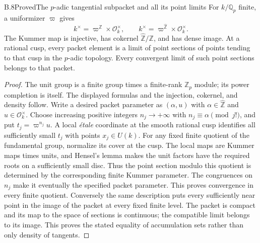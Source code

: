 \begin{statement}{B.8}{Proved}{The $p$-adic tangential subpacket and all its point limits}
For $k/\mathbb Q_p$ finite, a uniformizer $\varpi$ gives
\[
 k^\times=\varpi^{\mathbb Z}\times\mathcal O_k^\times,
 \qquad \widehat{k^\times}=\varpi^{\widehat{\mathbb Z}}
                         \times\mathcal O_k^\times.
\]
The Kummer map is injective, has cokernel
$\widehat{\mathbb Z}/\mathbb Z$, and has dense image.
At a rational cusp, every packet element is a limit of point sections
of points tending to that cusp in the $p$-adic topology.  Every
convergent limit of such point sections belongs to that packet.
\end{statement}
\begin{proof}
The unit group is a finite group times a finite-rank $\mathbb Z_p$
module; its power completion is itself.  The displayed formulas and
the injection, cokernel, and density follow.
Write a desired packet parameter as $(\alpha,u)$ with
$\alpha\in\widehat{\mathbb Z}$ and $u\in\mathcal O_k^\times$.
Choose increasing positive integers $n_j\to+\infty$ with
$n_j\equiv\alpha\pmod{j!}$, and put $t_j=\varpi^{n_j}u$.
A local \emph{\'etale} coordinate at the smooth rational cusp identifies
all sufficiently small $t_j$ with points $x_j\in U(k)$.
For any fixed finite quotient of the fundamental group, normalize
its cover at the cusp.  The local maps are Kummer maps times units,
and Hensel's lemma makes the unit factors have the required roots
on a sufficiently small disc.  Thus the point section modulo this
quotient is determined by the corresponding finite Kummer parameter.
The congruences on $n_j$ make it eventually the specified packet
parameter.  This proves convergence in every finite quotient.
Conversely the same description puts every sufficiently near point
in the image of the packet at every fixed finite level.  The packet
is compact and its map to the space of sections is continuous;
the compatible limit belongs to its image.  This proves the stated
equality of accumulation sets rather than only density of tangents.
\end{proof}

